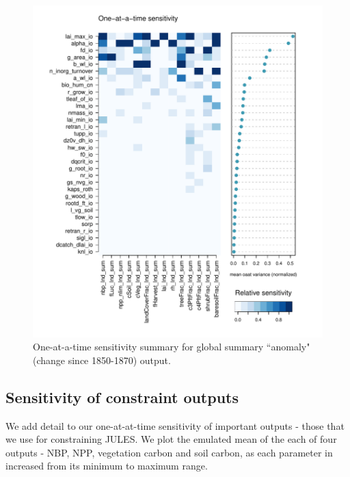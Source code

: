 \documentclass[gmd, manuscript]{copernicus}
\begin{document}
\begin{figure}[t]
\includegraphics[width=12cm]{./graphics/oat_var_sensmat_level1a_YAnom}
\caption{One-at-a-time sensitivity summary for global summary ``anomaly" (change since 1850-1870) output.}
\label{fig:oat_var_sensmat_level1a_YAnom}
\end{figure}


\subsection{Sensitivity of constraint outputs}

We add detail to our one-at-at-time sensitivity of important outputs - those that we use for constraining JULES. We plot the emulated mean of the each of four outputs - NBP, NPP, vegetation carbon and soil carbon, as each parameter in increased from its minimum to maximum range.
\end{document}
